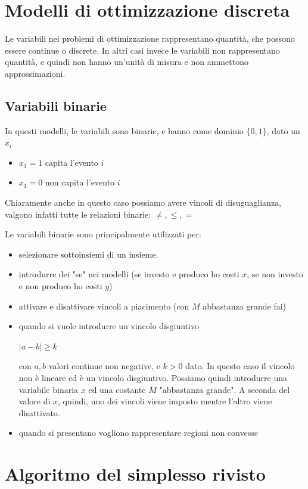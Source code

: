 \documentclass[11pt, oneside]{article}   	%
\begin{document}
\section{Modelli di ottimizzazione discreta}
Le variabili nei problemi di ottimizzazione rappresentano quantità, che possono essere continue o discrete. In altri casi invece le variabili non rappresentano quantità, e quindi non hanno un'unità di misura e non ammettono approssimazioni.

\subsection{Variabili binarie}
In questi modelli, le variabili sono binarie, e hanno come dominio $\{0, 1\}$, dato un $x_i$ \begin{itemize}
\item $x_1 = 1$ capita l'evento $i$
\item $x_1 = 0$ non capita l'evento $i$
\end{itemize}
Chiaramente anche in questo caso possiamo avere vincoli di disuguaglianza, valgono infatti tutte le relazioni binarie: $\neq, \leq, =$

Le variabili binarie sono principalmente utilizzati per:
\begin{itemize}
\item selezionare sottoinsiemi di un insieme.
\item introdurre dei "se" nei modelli (se investo e produco ho costi $x$, se non investo e non produco ho costi $y$)
\item attivare e disattivare vincoli a piacimento (con $M$ abbastanza grande fai)
\item quando si vuole introdurre un vincolo disgiuntivo
\begin{center}
$|a - b| \geq k$
\end{center}
con $a, b$ valori continue non negative, e $k > 0$ dato.
In questo caso il vincolo non è lineare ed è un vincolo disgiuntivo. Possiamo quindi introdurre una variabile binaria $x$ ed una costante $M$ "abbastanza grande".
A seconda del valore di $x$, quindi, uno dei vincoli viene imposto mentre l'altro viene disattivato.
\item quando si presentano vogliono rappresentare regioni non convesse

\end{itemize}

\section{Algoritmo del simplesso rivisto}


\end{document}
